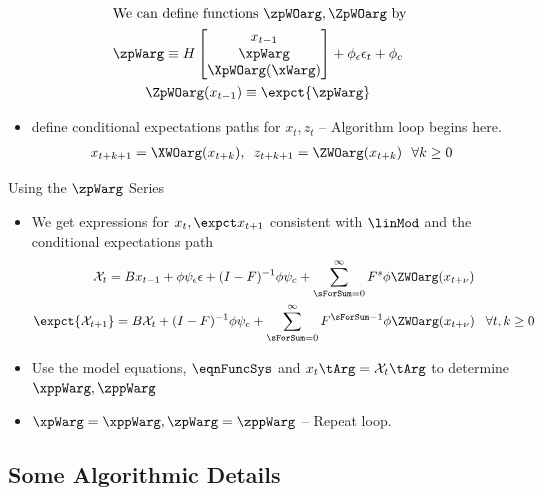 \documentclass[12pt]{article}
\begin{document}
\begin{gather*}
 \intertext{We can define functions $\zpWOarg,\ZpWOarg$ by}
\zpWarg\equiv H
\begin{bmatrix}
x_{t-1}\\ \xpWarg\\ \XpWOarg(\xWarg)
\end{bmatrix}+\phi_\epsilon \epsilon_t+\phi_c\\
\ZpWOarg(x_{t-1})\equiv \expct{\zpWarg}
\end{gather*}
 \begin{itemize}
\item  define conditional expectations paths for $x_t, z_t$ -- {\color{green}Algorithm loop begins here.}
 \begin{gather*}
 x_{t+k+1}=\XWOarg(x_{t+k}),\,\,\,z_{t+k+1}=\ZWOarg(x_{t+k})\,\,\,\,  \forall k\ge 0      \end{gather*}
   \end{itemize}

{Using the $\zpWarg$ Series}
{\small
  \begin{itemize}
  \item We get expressions for $x_t, \expct x_{t+1}$ consistent with $\linMod$ and the conditional expectations path
   \begin{gather*}
     \mathcal{X}_{t} =B x_{t-1}+ \phi \psi_\epsilon\epsilon + (I - F)^{-1} \phi \psi_c + \sum_{\sForSum=0}^\infty F^s \phi \ZWOarg(x_{t+\nu})\\
	\expct{ \mathcal{X}_{t+1}} =B \mathcal{X}_{t}  + (I - F)^{-1} \phi \psi_c+ \sum_{\sForSum =0}^\infty F^{\sForSum-1} \phi \ZWOarg(x_{t+\nu}) \,\,\,\,\,\forall t,k \ge  0
\end{gather*}
\item Use the model equations, $\eqnFuncSys$ and $x_t\tArg=\mathcal{X}_t\tArg$ to determine $\xppWarg, \zppWarg$
\item $\xpWarg=\xppWarg, \zpWarg=\zppWarg$ -- {\color{green}Repeat loop.}
  \end{itemize}
}


\subsection{{Some Algorithmic Details}}
\end{document}

